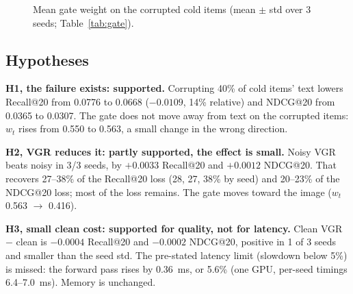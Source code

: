 \documentclass[conference]{IEEEtran}
\begin{document}
\begin{figure}[!t]
\centering
{}
\caption{Mean gate weight on the corrupted cold items (mean $\pm$ std over 3 seeds; Table~\ref{tab:gate}).}
\label{fig:gate}
\end{figure}

\subsection{Hypotheses}

\textbf{H1, the failure exists: supported.} Corrupting 40\% of cold items' text lowers Recall@20 from 0.0776 to 0.0668 ($-0.0109$, 14\% relative) and NDCG@20 from 0.0365 to 0.0307. The gate does not move away from text on the corrupted items: $w_t$ rises from 0.550 to 0.563, a small change in the wrong direction.

\textbf{H2, VGR reduces it: partly supported, the effect is small.} Noisy VGR beats noisy in 3/3 seeds, by $+0.0033$ Recall@20 and $+0.0012$ NDCG@20. That recovers 27--38\% of the Recall@20 loss (28, 27, 38\% by seed) and 20--23\% of the NDCG@20 loss; most of the loss remains. The gate moves toward the image ($w_t$ 0.563 $\to$ 0.416).

\textbf{H3, small clean cost: supported for quality, not for latency.} Clean VGR $-$ clean is $-0.0004$ Recall@20 and $-0.0002$ NDCG@20, positive in 1 of 3 seeds and smaller than the seed std. The pre-stated latency limit (slowdown below 5\%) is missed: the forward pass rises by 0.36~ms, or 5.6\% (one GPU, per-seed timings 6.4--7.0~ms). Memory is unchanged.
\end{document}

